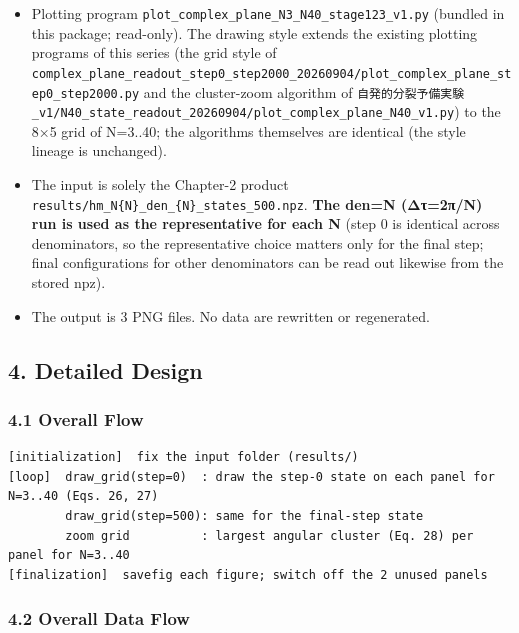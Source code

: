 \documentclass[
  a4paper,
]{ltjsarticle}
\providecommand{\tightlist}{%
  \setlength{\itemsep}{0pt}\setlength{\parskip}{0pt}}
\begin{document}
\begin{itemize}
\tightlist
\item
  Plotting program
  \texttt{plot\_complex\_plane\_N3\_N40\_stage123\_v1.py} (bundled in
  this package; read-only). The drawing style extends the existing
  plotting programs of this series (the grid style of
  \texttt{complex\_plane\_readout\_step0\_step2000\_20260904/plot\_complex\_plane\_step0\_step2000.py}
  and the cluster-zoom algorithm of
  \texttt{自発的分裂予備実験\_v1/N40\_state\_readout\_20260904/plot\_complex\_plane\_N40\_v1.py})
  to the 8×5 grid of N=3..40; the algorithms themselves are identical
  (the style lineage is unchanged).
\item
  The input is solely the Chapter-2 product
  \texttt{results/hm\_N\{N\}\_den\_\{N\}\_states\_500.npz}. \textbf{The
  den=N (Δτ=2π/N) run is used as the representative for each N} (step 0
  is identical across denominators, so the representative choice matters
  only for the final step; final configurations for other denominators
  can be read out likewise from the stored npz).
\item
  The output is 3 PNG files. No data are rewritten or regenerated.
\end{itemize}

\subsection{4. Detailed Design}\label{detailed-design}

\subsubsection{4.1 Overall Flow}\label{overall-flow}

\begin{verbatim}
[initialization]  fix the input folder (results/)
[loop]  draw_grid(step=0)  : draw the step-0 state on each panel for N=3..40 (Eqs. 26, 27)
        draw_grid(step=500): same for the final-step state
        zoom grid          : largest angular cluster (Eq. 28) per panel for N=3..40
[finalization]  savefig each figure; switch off the 2 unused panels
\end{verbatim}

\subsubsection{4.2 Overall Data Flow}\label{overall-data-flow}
\end{document}
